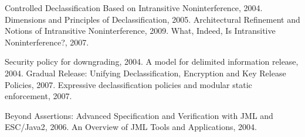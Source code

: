 \newpage
\begin{thebibliography}{10}
Controlled Declassification Based on Intransitive Noninterference, 2004.
Dimensions and Principles of Declassification, 2005.
Architectural Refinement and Notions of Intransitive Noninterference, 2009.
What, Indeed, Is Intransitive Noninterference?, 2007.


Security policy for downgrading, 2004.
A model for delimited information release, 2004.
Gradual Release: Unifying Declassification, Encryption and Key Release Policies,
2007.
Expressive declassification policies and modular static enforcement, 2007.

Beyond Assertions: Advanced Specification and Verification with JML and
ESC/Java2, 2006.
An Overview of JML Tools and Applications, 2004.
\end{thebibliography}
